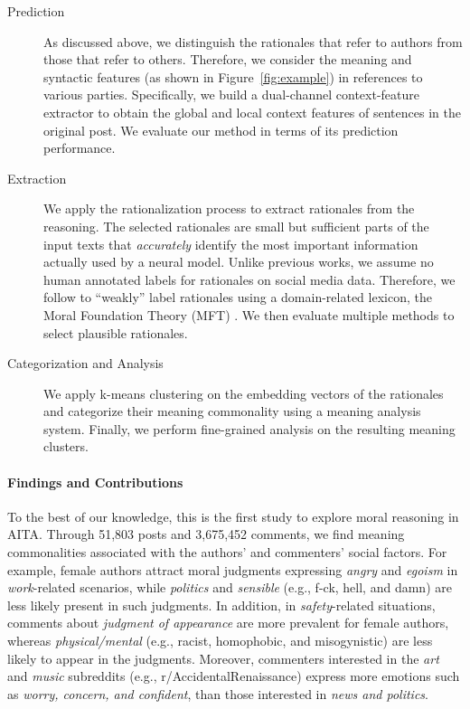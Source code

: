 \documentclass[letterpaper]{article} %
\newcommand{\fqt}[1]{``#1''}
\begin{document}
\begin{description}
\item[Prediction] As discussed above, we distinguish the rationales that refer to authors from those that refer to others. 
Therefore, we consider the meaning and syntactic features (as shown in Figure~\ref{fig:example}) in references to various parties.
Specifically, we build a dual-channel context-feature extractor to obtain the global and local context features of sentences in the original post.
We evaluate our method in terms of its prediction performance.

\item[Extraction] We apply the rationalization process \cite{lei-2016-rationalizing, bastings-2019-interpretable, deyoung-2020-eraser} to extract rationales from the reasoning.
The selected rationales are small but sufficient parts of the input texts that \textsl{accurately} \cite{jain-2020-learning} identify the most important information actually used by a neural model.
Unlike previous works, we assume no human annotated labels for rationales on social media data.
Therefore, we follow \citet{jiang-2021-structurizing} to \fqt{weakly} label rationales using a domain-related lexicon, the Moral Foundation Theory (MFT) \cite{haidt-2007-mft}.
We then evaluate multiple methods to select plausible rationales.

\item[Categorization and Analysis] We apply k-means clustering \cite{lloyd-1982-kmeans} on the embedding vectors of the rationales and categorize their meaning commonality using a meaning analysis system.
Finally, we perform fine-grained analysis on the resulting meaning clusters. 
\end{description}

\paragraph{Findings and Contributions}
To the best of our knowledge, this is the first study to explore moral reasoning in AITA.
Through 51,803 posts and 3,675,452 comments, we find meaning commonalities associated with the authors' and commenters' social factors.
For example, female authors attract moral judgments expressing \textsl{angry} and \textsl{egoism} in \textsl{work}-related scenarios, while \textsl{politics} and \textsl{sensible} (e.g., f-ck, hell, and damn) are less likely present in such judgments. In addition, in \textsl{safety}-related situations, comments about \textsl{judgment of appearance} are more prevalent for female authors, whereas \textsl{physical/mental} (e.g., racist, homophobic, and misogynistic) are less likely to appear in the judgments.
Moreover, commenters interested in the \textsl{art} and \textsl{music} subreddits (e.g., r/AccidentalRenaissance) express more emotions such as \textsl{worry, concern, and confident}, than those interested in \textsl{news and politics}.
\end{document}
